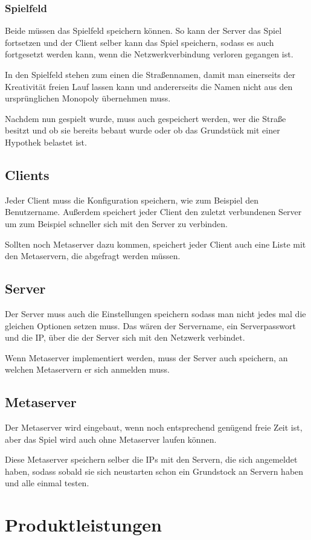 \documentclass[a4paper,10pt]{article}
\begin{document}
\subsubsection{Spielfeld}
Beide müssen das Spielfeld speichern können. So kann der Server das Spiel fortsetzen und der Client
selber kann das Spiel speichern, sodass es auch fortgesetzt werden kann, wenn die Netzwerkverbindung
verloren gegangen ist.

In den Spielfeld stehen zum einen die Straßennamen, damit man einerseits der Kreativität freien Lauf
lassen kann und andererseits die Namen nicht aus den ursprünglichen Monopoly übernehmen muss.

Nachdem nun gespielt wurde, muss auch gespeichert werden, wer die Straße besitzt und ob sie bereits
bebaut wurde oder ob das Grundstück mit einer Hypothek belastet ist.
\subsection{Clients}
Jeder Client muss die Konfiguration speichern, wie zum Beispiel den Benutzername. Außerdem speichert
jeder Client den zuletzt verbundenen Server um zum Beispiel schneller sich mit den Server zu verbinden.

Sollten noch Metaserver dazu kommen, speichert jeder Client auch eine Liste mit den Metaservern, die
abgefragt werden müssen.
\subsection{Server}
Der Server muss auch die Einstellungen speichern sodass man nicht jedes mal die gleichen Optionen setzen muss.
Das wären der Servername, ein Serverpasswort und die IP, über die der Server sich mit den Netzwerk verbindet.

Wenn Metaserver implementiert werden, muss der Server auch speichern, an welchen Metaservern er sich anmelden
muss.
\subsection{Metaserver}
Der Metaserver wird eingebaut, wenn noch entsprechend genügend freie Zeit ist, aber das Spiel wird auch ohne
Metaserver laufen können.

Diese Metaserver speichern selber die IPs mit den Servern, die sich angemeldet haben, sodass sobald sie sich
neustarten schon ein Grundstock an Servern haben und alle einmal testen.
\section{Produktleistungen}
\end{document}
